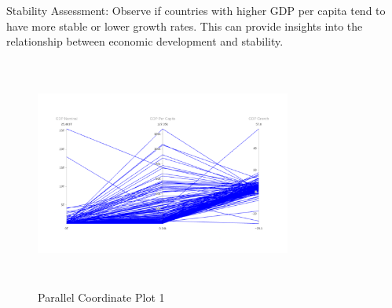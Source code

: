 \documentclass[conference]{IEEEtran}
\begin{document}
Stability Assessment: Observe if countries with higher GDP per capita tend to have more stable or lower growth rates. This can provide insights into the relationship between economic development and stability.\\
\begin{figure}
\centering
    \includegraphics[height=3in, width=0.75\textwidth]{images_ashish/pcp_1.png}
    \caption{Parallel Coordinate Plot 1}
    \label{fig1}
\end{figure}
\end{document}
